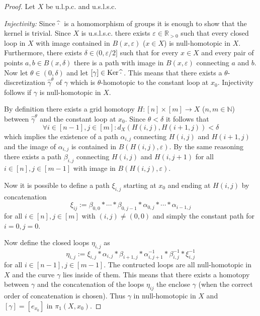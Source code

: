 \documentclass[a4paper, 11pt, twoside]{article}
\newcommand{\R}[0]{\mathbb{R}}
\newcommand{\N}[0]{\mathbb{N}}
\theoremstyle{break}
\theoremstyle{break}
\begin{document}
\begin{proof}
  Let $X$ be u.l.p.c. and u.s.l.s.c.

  \textit{Injectivity:} Since $\widehat{\cdot}\hspace*{2px}$ is a homomorphism of groups it is enough to show that the kernel is trivial.
  Since $X$ is u.s.l.s.c. there exists $\varepsilon \in \R_{>0}$ 
  such that every closed loop in $X$ with image contained in $B(x, \varepsilon)$ ($x\in X$) is null-homotopic in $X$. Furthermore,
  there exists $\delta \in (0, \varepsilon/2]$ such that for every $x \in X$ and every pair of points $a,b \in B(x, \delta)$ there is a path with image in $B(x, \varepsilon)$ connecting $a$ and $b$.
  Now let $\theta \in (0, \delta)$ and let $[\gamma] \in {\rm Ker} \hspace*{2px} \widehat{\cdot}\hspace*{2px}$. 
  This means that there exists a $\theta$-discretization $\widehat{\gamma}^{\theta}$ of $\gamma$ which is $\theta$-homotopic to the constant loop at $x_0$.
  Injectivity follows if $\gamma$ is null-homotopic in $X$.
  
  By definition there exists a grid homotopy $H\colon [n] \times [m] \to X$ ($n,m\in\N$) between $\widehat{\gamma}^{\theta}$ and the constant loop at $x_0$.
  Since $\theta < \delta$ it follows that 
  \begin{equation*}
    \forall i \in [n-1], j \in [m]\colon d_X(H(i,j), H(i+1,j)) < \delta
  \end{equation*}
  which implies the existence of a path $\alpha_{i,j}$ connecting $H(i,j)$ and $H(i+1,j)$ and
  the image of $\alpha_{i,j}$ is contained in $B(H(i,j), \varepsilon)$.
  By the same reasoning there exists a path $\beta_{i,j}$ connecting $H(i,j)$ and $H(i,j+1)$ for all $i \in [n], j \in [m-1]$ with image in $B(H(i,j), \varepsilon)$.

  Now it is possible to define a path $\xi_{i,j}$ starting at $x_0$ and ending at $H(i,j)$ by concatenation
  \begin{equation*}
    \xi_{ij} := \beta_{0,0} * \cdots * \beta_{0,j-1} * \alpha_{0,j} * \cdots * \alpha_{i-1,j}
  \end{equation*}
  for all $i \in [n], j \in [m]$ with $(i,j) \neq (0,0)$ and simply the constant path for $i = 0, j = 0$. 
  
  Now define the closed loops $\eta_{i,j}$ as
  \begin{equation*}
    \eta_{i,j} := \xi_{i,j} * \alpha_{i,j} * \beta_{i+1,j} * \alpha^{-1}_{i,j+1} * \beta^{-1}_{i,j} * \xi^{-1}_{i,j}
  \end{equation*}
  for all $i \in [n-1], j \in [m-1]$.
  The contructed loops are all null-homotopic in $X$ and the curve $\gamma$ lies inside of them. 
  This means that there exists a homotopy between $\gamma$ and the concatenation of the loops $\eta_{ij}$ the enclose $\gamma$ (when the correct order of concatenation is chosen).
  Thus $\gamma$ in null-homotopic in $X$ and $[\gamma] = [e_{x_0}]$ in $\pi_1(X, x_0)$.


\end{proof}
\end{document}
